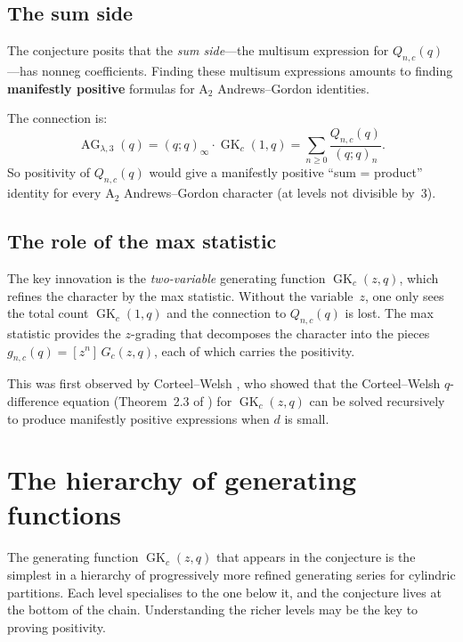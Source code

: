 \documentclass[11pt]{article}
\theoremstyle{plain}
\theoremstyle{definition}
\newcommand{\GK}{\operatorname{GK}}
\newcommand{\AG}{\operatorname{AG}}
\newcommand{\qpoch}[2]{(#1;#2)_\infty}
\newcommand{\qpochn}[3]{(#1;#2)_{#3}}
\begin{document}
\subsection{The sum side}

The conjecture posits that the \emph{sum side}---the multisum expression
for $Q_{n,c}(q)$---has nonneg coefficients.  Finding these multisum
expressions amounts to finding \textbf{manifestly positive} formulas for
$\mathrm{A}_2$ Andrews--Gordon identities.

The connection is:
\begin{equation}
  \AG_{\lambda,3}(q)
  = \qpoch{q}{q} \cdot \GK_c(1,q)
  = \sum_{n \geq 0} \frac{Q_{n,c}(q)}{\qpochn{q}{q}{n}}.
  \label{eq:AG-from-Q}
\end{equation}
So positivity of $Q_{n,c}(q)$ would give a manifestly positive
``sum = product'' identity for every $\mathrm{A}_2$ Andrews--Gordon
character (at levels not divisible by~3).

\subsection{The role of the max statistic}

The key innovation is the \emph{two-variable} generating function
$\GK_c(z,q)$, which refines the character by the max statistic.
Without the variable~$z$, one only sees the total count $\GK_c(1,q)$
and the connection to $Q_{n,c}(q)$ is lost.  The max statistic provides the
$z$-grading that decomposes the character into the pieces
$g_{n,c}(q) = [z^n]\,G_c(z,q)$, each of which carries the positivity.

This was first observed by Corteel--Welsh \cite{CW}, who showed that
the Corteel--Welsh $q$-difference equation (Theorem~2.3 of \cite{CDU}) for
$\GK_c(z,q)$ can be solved recursively to produce manifestly positive
expressions when $d$ is small.


\section{The hierarchy of generating functions}
\label{sec:hierarchy}

The generating function $\GK_c(z,q)$ that appears in the conjecture is the
simplest in a hierarchy of progressively more refined generating series
for cylindric partitions.  Each level specialises to the one below it, and
the conjecture lives at the bottom of the chain.  Understanding the richer
levels may be the key to proving positivity.
\end{document}
